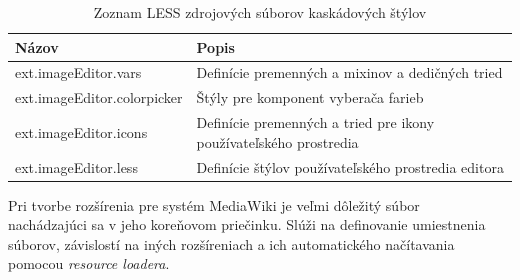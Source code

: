 \begin{table}
	\begin{tabular}{ | m{6cm} | m{6.5cm} | } \hline
		\textbf{Názov} & \textbf{Popis} \\ \hline \hline
		
		ext.imageEditor.vars & Definície premenných a mixinov a dedičných tried \\\hline
		ext.imageEditor.colorpicker & Štýly pre komponent vyberača farieb \\\hline
		ext.imageEditor.icons & Definície premenných a tried pre ikony používateľského prostredia \\\hline
		ext.imageEditor.less & Definície štýlov používateľského prostredia editora \\\hline
		
		\hline
	\end{tabular}
	\caption{Zoznam LESS zdrojových súborov kaskádových štýlov}
	\label{tab:editor-styles-files}
\end{table}

Pri tvorbe rozšírenia pre systém MediaWiki je veľmi dôležitý súbor \\
 nachádzajúci sa v jeho koreňovom priečinku. Slúži na definovanie umiestnenia súborov, závislostí na iných rozšíreniach a ich automatického načítavania pomocou \textit{resource loadera}.




